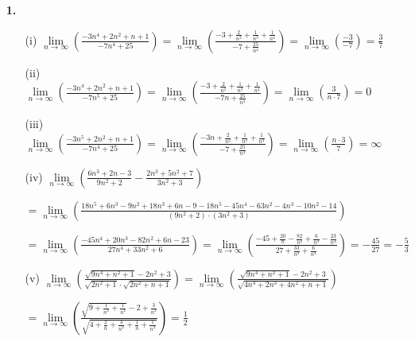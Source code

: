 \documentclass[a4paper,11pt]{scrartcl}
\author{\authorinfo}
\title{\titleinfo}
\date{\today}
\newcommand{\bra}[1]{\left(#1\right)}
\newcommand{\limn}[1]{\lim\limits_{n \rightarrow \infty}\bra{#1}}
\begin{document}
\maketitle
\begin{enumerate}
    \item[\textbf{1.}]
        \begin{enumerate}
            \item[(i)]
                $\limn{\frac{-3n^4+2n^2+n+1}{-7n^4+25}} =
                \limn{\frac{-3+\frac{2}{n^2}+\frac{1}{n^3}+\frac{1}{n^4}}{-7+\frac{25}{n^4}}} =
                \limn{\frac{-3}{-7}} =
                \frac{3}{7}$
            \item[(ii)]
                $\limn{\frac{-3n^4+2n^2+n+1}{-7n^5+25}} =
                \limn{\frac{-3+\frac{2}{n^2}+\frac{1}{n^3}+\frac{1}{n^4}}{-7n+\frac{25}{n^4}}} =
                \limn{\frac{3}{n \cdot 7}} = 0$
            \item[(iii)]
                $\limn{\frac{-3n^5+2n^2+n+1}{-7n^4+25}} =
                \limn{\frac{-3n+\frac{2}{n^2}+\frac{1}{n^3}+\frac{1}{n^4}}{-7+\frac{25}{n^4}}} =
                \limn{\frac{n \cdot 3}{7}}=\infty$
            \item[(iv)]
                $\limn{\frac{6n^3+2n-3}{9n^2+2}-\frac{2n^3+5n^2+7}{3n^2+3}}$

                $= \limn{\frac{18n^5+6n^3-9n^2+18n^3+6n-9-18n^5-45n^4-63n^2-4n^3-10n^2-14}{(9n^2+2)\cdot(3n^2+3)}}$

                $= \limn{\frac{-45n^4+20n^3-82n^2+6n-23}{27n^4+33n^2+6}} =
                \limn{\frac{-45+\frac{20}{n}-\frac{82}{n^2}+\frac{6}{n^3}-\frac{23}{n^4}}{27+\frac{33}{n^2}+\frac{6}{n^4}}} =
                -\frac{45}{27} = -\frac{5}{3}$

            \item[(v)]
                $\limn{\frac{\sqrt{9n^4+n^2+1}-2n^2+3}{\sqrt{2n^2+1}\cdot \sqrt{2n^2+n+1}}}
                = \limn{\frac{\sqrt{9n^4+n^2+1}-2n^2+3}{\sqrt{4n^4+2n^3+4n^2+n+1}}}$

                $= \limn{\frac{\sqrt{9+\frac{1}{n^2}+\frac{1}{n^4}}-2+\frac{3}{n^2}}{\sqrt{4+\frac{2}{n}+\frac{4}{n^2}+\frac{1}{n}+\frac{1}{n^4}}}}
                =\frac{1}{2}$

        \end{enumerate}


\end{enumerate}
\end{document}
